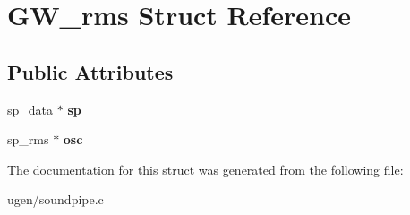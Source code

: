 \hypertarget{structGW__rms}{}\section{G\+W\+\_\+rms Struct Reference}
\label{structGW__rms}
\subsection*{Public Attributes}
\begin{DoxyCompactItemize}
\item 
\hypertarget{structGW__rms_aa057694087ace3dcdf8c35b502ab2c8c}{}\label{structGW__rms_aa057694087ace3dcdf8c35b502ab2c8c} 
sp\+\_\+data $\ast$ {\bfseries sp}
\item 
\hypertarget{structGW__rms_a9c9827111f9f24892d9fd49ad9a6d474}{}\label{structGW__rms_a9c9827111f9f24892d9fd49ad9a6d474} 
sp\+\_\+rms $\ast$ {\bfseries osc}
\end{DoxyCompactItemize}


The documentation for this struct was generated from the following file\+:\begin{DoxyCompactItemize}
\item 
ugen/soundpipe.\+c\end{DoxyCompactItemize}
